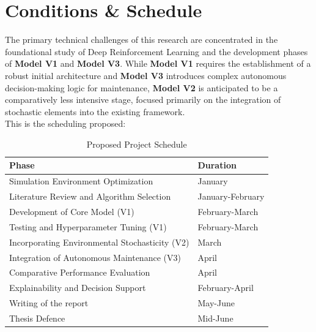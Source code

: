 \documentclass[a4paper]{scrartcl}
\begin{document}
\section{Conditions \& Schedule}
The primary technical challenges of this research are concentrated in the foundational study of Deep Reinforcement Learning and the development phases of \textbf{Model V1} and \textbf{Model V3}. While \textbf{Model V1} requires the establishment of a robust initial architecture and \textbf{Model V3} introduces complex autonomous decision-making logic for maintenance, \textbf{Model V2} is anticipated to be a comparatively less intensive stage, focused primarily on the integration of stochastic elements into the existing framework.\\
This is the scheduling proposed:
\begin{table}[H]
\centering
\begin{tabular}{|p{9cm}|p{4cm}|}
\hline
\textbf{Phase} & \textbf{Duration} \\
\hline
Simulation Environment Optimization & January \\
\hline
Literature Review and Algorithm Selection &  January-February \\
\hline
Development of Core Model (V1) & February-March  \\
\hline
Testing and Hyperparameter Tuning (V1) & February-March \\
\hline
Incorporating Environmental Stochasticity (V2) & March \\
\hline
Integration of Autonomous Maintenance (V3) & April \\
\hline
Comparative Performance Evaluation &  April \\
\hline
Explainability and Decision Support &  February-April \\
\hline
Writing of the report &  May-June \\
\hline
Thesis Defence & Mid-June \\
\hline
\end{tabular}
\caption{Proposed Project Schedule}
\end{table}
\end{document}
